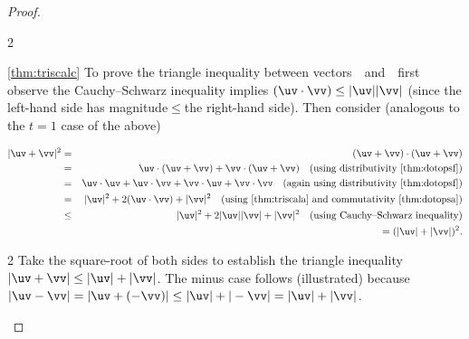 \begin{proof}
\begin{description}
\begin{figbox}{2}%
\item[\ref{thm:triscalc}]
To prove the triangle inequality between vectors~\uv\ and~\vv\ first observe the Cauchy--Schwarz inequality implies \((\uv\cdot\vv)\leq|\uv||\vv|\) (since the left-hand side has magnitude\({}\leq{}\)the right-hand side).
Then consider (analogous to the \(t=1\) case of the above)
\end{figbox}
\begin{eqnarray*}
|\uv+\vv|^2
&=&(\uv+\vv)\cdot(\uv+\vv)
\\&=&\uv\cdot(\uv+\vv)+\vv\cdot(\uv+\vv)
\quad(\text{using distributivity~\ref{thm:dotopsf}})
\\&=&\uv\cdot\uv+\uv\cdot\vv+\vv\cdot\uv+\vv\cdot\vv
\quad(\text{again using distributivity~\ref{thm:dotopsf}})
\\&=&|\uv|^2+2(\uv\cdot\vv)+|\vv|^2
\quad(\text{using~\ref{thm:triscala} and commutativity~\ref{thm:dotopsa}})
\\&\leq&|\uv|^2+2|\uv||\vv|+|\vv|^2
\quad(\text{using Cauchy--Schwarz inequality})
\\&&{}=(|\uv|+|\vv|)^2.
\end{eqnarray*}
\begin{figbox}{2}%
Take the square-root of both sides to establish the triangle inequality \(|\uv+\vv|\leq|\uv|+|\vv|\).
The minus case follows (illustrated) because \(|\uv-\vv|=|\uv+(-\vv)|\leq|\uv|+|-\vv|=|\uv|+|\vv|\).   
\reParshape
\end{figbox}
\end{description}
\end{proof}

\reParshape


